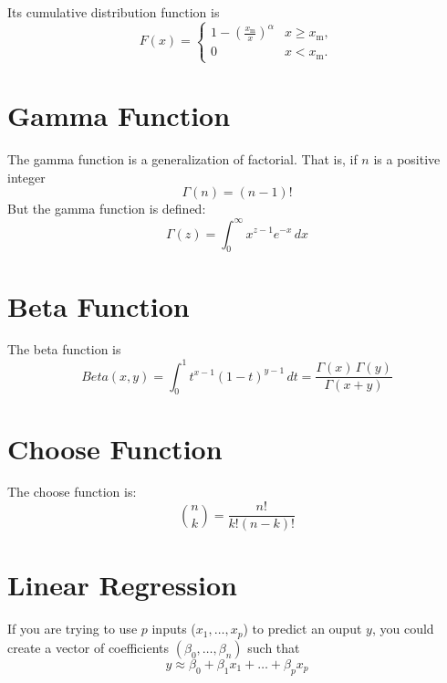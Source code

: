 \documentclass[12pt]{article}
\begin{document}
Its cumulative distribution function is
\begin{equation*}
F(x) = \begin{cases}
1-\left(\frac{x_\mathrm{m}}{x}\right)^\alpha & x \ge x_\mathrm{m}, \\
0 & x < x_\mathrm{m}.\end{cases}
\end{equation*}

\section*{Gamma Function}

The gamma function is a generalization of factorial. That is, if $n$ is a positive integer
\begin{equation*}
\Gamma(n) = (n-1)!
\end{equation*}
But the gamma function is defined:
\begin{equation*}
\Gamma(z) = \int_0^\infty x^{z-1} e^{-x}\,dx
\end{equation*}

\section*{Beta Function}

The beta function is 
\begin{equation*}
Beta(x,y) = \int_0^1t^{x-1}(1-t)^{y-1}\,dt = \frac{\Gamma(x)\,\Gamma(y)}{\Gamma(x+y)}
\end{equation*}

\section*{Choose Function}

The choose function is:
\begin{equation*}
\binom{n}{k} = \frac{n!}{k! (n-k)!}
\end{equation*}


\section*{Linear Regression}

If you are trying to use $p$ inputs ($x_1, \ldots, x_p$) to predict an ouput $y$, you could create a vector of coefficients $(\beta_0, \ldots, \beta_n)$ such that
\begin{equation*}
y \approx \beta_0 + \beta_1 x_1 + \ldots + \beta_p x_p
\end{equation*}
\end{document}
